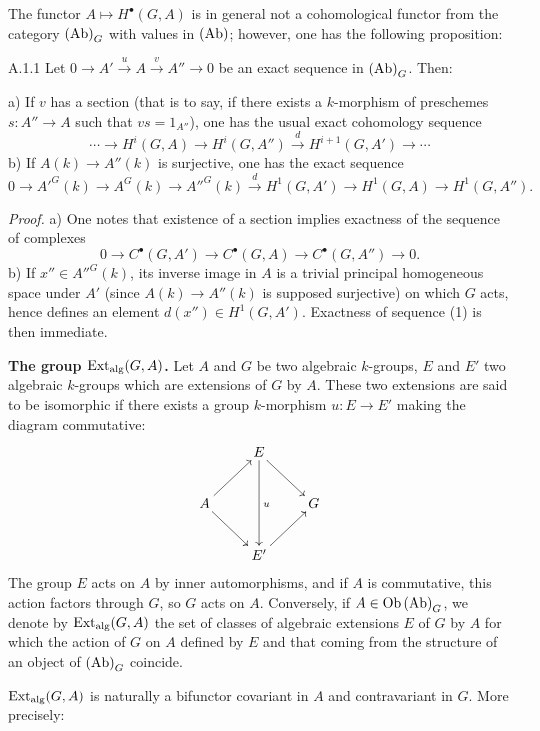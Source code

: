 The functor $A\mapsto H^\bullet(G,A)$ is in general not a cohomological functor from the category $\textup{(Ab)}_G$ with values in $\textup{(Ab)}$; however, one has the following proposition:
\begin{proposition}{A.1.1}\label{XVII.A.1.1}
Let $0\to A'\xrightarrow{u}A\xrightarrow{v}A''\to0$ be an exact sequence in $\textup{(Ab)}_G$. Then:

\noindent a) If $v$ has a section (that is to say, if there exists a $k$-morphism of preschemes $s:A''\to A$ such that $vs=1_{A''}$), one has the usual exact cohomology sequence
\[
\cdots\longrightarrow H^i(G,A)\longrightarrow H^i(G,A'')\xrightarrow{d}H^{i+1}(G,A')\longrightarrow\cdots
\]
\noindent b) If $A(k)\to A''(k)$ is surjective, one has the exact sequence
\[
0\to A'^G(k)\to A^G(k)\to A''^G(k)\xrightarrow{d}H^1(G,A')\to H^1(G,A)\to H^1(G,A'').\tag{1}
\]
\end{proposition}
\par\noindent\emph{Proof.}
a) One notes that existence of a section implies exactness of the sequence of complexes
\[
0\longrightarrow C^\bullet(G,A')\longrightarrow C^\bullet(G,A)\longrightarrow C^\bullet(G,A'')\longrightarrow0.
\]
b) If $x''\in A''^G(k)$, its inverse image in $A$ is a trivial principal homogeneous space under $A'$ (since $A(k)\to A''(k)$ is supposed surjective) on which $G$ acts, hence defines an element $d(x'')\in H^1(G,A')$. Exactness of sequence (1) is then immediate.

\label{XVII.A.2}\textbf{The group $\operatorname{Ext}_{\mathrm{alg}}(G,A)$.}
Let $A$ and $G$ be two algebraic $k$-groups, $E$ and $E'$ two algebraic $k$-groups which are extensions of $G$ by $A$. These two extensions are said to be isomorphic if there exists a group $k$-morphism $u:E\to E'$ making the diagram commutative:
\[
\xymatrix{&E\ar[dr]\ar[dd]^u&\\A\ar[ur]\ar[dr]&&G\\&E'\ar[ur]&}
\]
The group $E$ acts on $A$ by inner automorphisms, and if $A$ is commutative, this action factors through $G$, so $G$ acts on $A$. Conversely, if $A\in\operatorname{Ob}\textup{(Ab)}_G$, we denote by $\operatorname{Ext}_{\mathrm{alg}}(G,A)$ the set of classes of algebraic extensions $E$ of $G$ by $A$ for which the action of $G$ on $A$ defined by $E$ and that coming from the structure of an object of $\textup{(Ab)}_G$ coincide.

$\operatorname{Ext}_{\mathrm{alg}}(G,A)$ is naturally a bifunctor covariant in $A$ and contravariant in $G$. More precisely:

